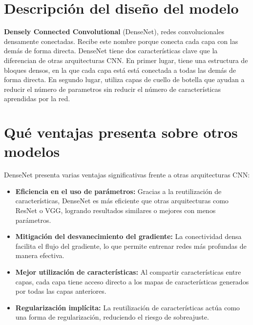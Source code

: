 \documentclass{article}
\begin{document}
\section{Descripción del diseño del modelo}
\textbf{Densely Connected Convolutional} (DenseNet)\cite{huang2018denselyconnectedconvolutionalnetworks}, redes convolucionales densamente conectadas. Recibe este nombre porque conecta cada capa con las demás de forma directa.
DenseNet tiene dos características clave que la diferencian de otras arquitecturas CNN. En primer lugar, tiene una estructura de bloques densos, en la que cada capa está
está conectada a todas las demás de forma directa. En segundo lugar, utiliza capas de cuello de botella que ayudan a reducir el número de parametros sin reducir el número
de características aprendidas por la red.

\section{Qué ventajas presenta sobre otros modelos}

DenseNet presenta varias ventajas significativas frente a otras arquitecturas CNN\cite{densenet_review}:
\begin{itemize}
    \item \textbf{Eficiencia en el uso de parámetros:} Gracias a la reutilización de características, DenseNet es más eficiente que otras arquitecturas como ResNet o VGG, logrando resultados similares o mejores con menos parámetros.
    \item \textbf{Mitigación del desvanecimiento del gradiente:} La conectividad densa facilita el flujo del gradiente, lo que permite entrenar redes más profundas de manera efectiva.
    \item \textbf{Mejor utilización de características:} Al compartir características entre capas, cada capa tiene acceso directo a los mapas de características generados por todas las capas anteriores.
    \item \textbf{Regularización implícita:} La reutilización de características actúa como una forma de regularización, reduciendo el riesgo de sobreajuste.
\end{itemize}
\end{document}
